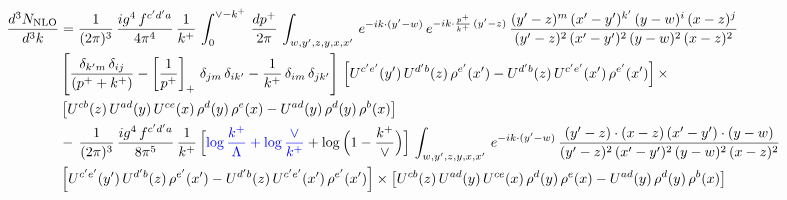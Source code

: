 \documentclass[9pt]{article}
\numberwithin{equation}{section}
\begin{document}
\begin{align}
    \frac{d^{3}N_{\rm NLO}}{d^{3}k} & = \frac{1}{(2\pi)^{3}}\, \frac{ig^{4}\,f^{c'd'a}}{4\pi^{4}}\, \frac{1}{k^{+}}\,\int_{0}^{\vee-k^{+}}\, \frac{dp^{+}}{2\pi}\, \int_{w,y',z,y,x,x'}\, e^{-ik\cdot (y'-w)}\, e^{-ik\cdot \frac{p^{+}}{k^{+}}\,(y'-z)}\,\frac{(y'-z)^{m}\,(x'-y')^{k'}\,(y-w)^{i}\,(x-z)^{j}}{(y'-z)^{2}\,(x'-y')^{2}\,(y-w)^{2}\,(x-z)^{2}}\notag \\ & \left[\frac{\delta_{k'm}\,\delta_{ij}}{(p^{+}+k^{+})}-\left[\frac{1}{p^{+}}\right]_{+}\,\delta_{jm}\,\delta_{ik'}-\frac{1}{k^{+}}\, \delta_{im}\, \delta_{jk'}\right]\, \left[U^{c'e'}(y')\,U^{d'b}(z)\,\rho^{e'}(x')-U^{d'b}(z)\,U^{c'e'}(x')\,\rho^{e'}(x')\right]\times\notag \\ &  \left[U^{cb}(z)\,U^{ad}(y)\,U^{ce}(x)\,\rho^{d}(y)\,\rho^{e}(x)-U^{ad}(y)\,\rho^{d}(y)\,\rho^{b}(x)\right]\notag \\ &  -\,\frac{1}{(2\pi)^{3}}\, \frac{ig^{4}\,f^{c'd'a}}{8\pi^{5}}\, \frac{1}{k^{+}}\,\Big[{\color{blue}\log\frac{k^{+}}{\Lambda}+\log\frac{\vee}{k^{+}}}+\log\Big(1-\frac{k^{+}}{\vee}\Big)\Big]\, \int_{w,y',z,y,x,x'}\, e^{-ik\cdot (y'-w)}\,\frac{(y'-z)\cdot (x-z)\,(x'-y')\cdot (y-w)}{(y'-z)^{2}\,(x'-y')^{2}\,(y-w)^{2}\,(x-z)^{2}}\notag \\ & \left[U^{c'e'}(y')\,U^{d'b}(z)\,\rho^{e'}(x')-U^{d'b}(z)\,U^{c'e'}(x')\,\rho^{e'}(x')\right]\times  \left[U^{cb}(z)\,U^{ad}(y)\,U^{ce}(x)\,\rho^{d}(y)\,\rho^{e}(x)-U^{ad}(y)\,\rho^{d}(y)\,\rho^{b}(x)\right]
\end{align}
\end{document}
